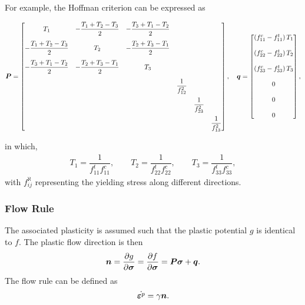 For example, the Hoffman criterion can be expressed as
\begin{tiny}
\begin{gather}\label{eq:hoffman_criterion}
\bm{P}=\begin{bmatrix}
T_1&-\dfrac{T_1+T_2-T_3}{2}&-\dfrac{T_3+T_1-T_2}{2}&&&\\[4mm]
-\dfrac{T_1+T_2-T_3}{2}&T_2&-\dfrac{T_2+T_3-T_1}{2}&&&\\[4mm]
-\dfrac{T_3+T_1-T_2}{2}&-\dfrac{T_2+T_3-T_1}{2}&T_3&&&\\[4mm]
&&&\dfrac{1}{f_{12}^2}&&\\[4mm]
&&&&\dfrac{1}{f_{23}^2}&\\[4mm]
&&&&&\dfrac{1}{f_{13}^2}
\end{bmatrix},\quad
\bm{q}=\begin{bmatrix}
\left(f_{11}^c-f_{11}^t\right)T_1\\[4mm]
\left(f_{22}^c-f_{22}^t\right)T_2\\[4mm]
\left(f_{33}^c-f_{33}^t\right)T_3\\[4mm]
0\\[4mm]
0\\[4mm]
0
\end{bmatrix},
\end{gather}
\end{tiny}
in which,
\begin{gather}
T_1=\dfrac{1}{f_{11}^tf_{11}^c},\qquad
T_2=\dfrac{1}{f_{22}^tf_{22}^c},\qquad
T_3=\dfrac{1}{f_{33}^tf_{33}^c},
\end{gather}
with $f_{ij}^\aleph$ representing the yielding stress along different directions.
\subsubsection{Flow Rule}
The associated plasticity is assumed such that the plastic potential $g$ is identical to $f$. The plastic flow direction is then
\begin{gather}
\bm{n}=\dfrac{\partial{g}}{\partial{\bm{\sigma}}}=\dfrac{\partial{f}}{\partial{\bm{\sigma}}}=\bm{P}\bm{\sigma}+\bm{q}.
\end{gather}
The flow rule can be defined as
\begin{gather}
\dot{\bm{\varepsilon}^p}=\gamma\bm{n}.
\end{gather}
